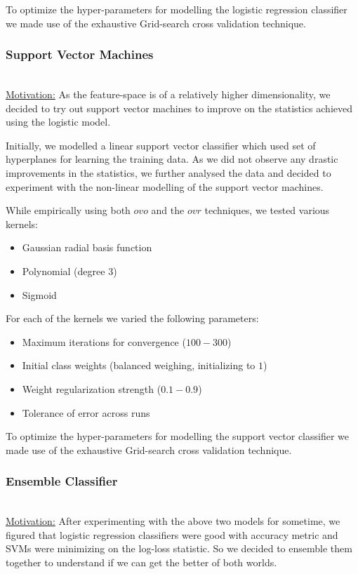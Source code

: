 \documentclass[fleqn,10pt]{SelfArx} %
\begin{document}
To optimize the hyper-parameters for modelling the logistic regression classifier we made use of the exhaustive Grid-search cross validation technique.

\subsubsection{Support Vector Machines}~\\
\underline{Motivation:} As the feature-space is of a relatively higher dimensionality, we decided to try out support vector machines to improve on the statistics achieved using the logistic model.

Initially, we modelled a linear support vector classifier which used set of hyperplanes for learning the training data. As we did not observe any drastic improvements in the statistics, we further analysed the data and decided to experiment with the non-linear modelling of the support vector machines.

While empirically using both $ovo$ and the $ovr$ techniques, we tested various kernels:
\begin{itemize}
  \item Gaussian radial basis function
  \item Polynomial (degree 3)
  \item Sigmoid
\end{itemize}

For each of the kernels we varied the following parameters:
\begin{itemize}
  \item Maximum iterations for convergence ($100-300$)
  \item Initial class weights (balanced weighing, initializing to $1$)
  \item Weight regularization strength ($0.1-0.9$)
  \item Tolerance of error across runs
\end{itemize}

To optimize the hyper-parameters for modelling the support vector classifier we made use of the exhaustive Grid-search cross validation technique.
\subsubsection{Ensemble Classifier}~\\
\underline{Motivation:} After experimenting with the above two models for sometime, we figured that logistic regression classifiers were good with accuracy metric and SVMs were minimizing on the log-loss statistic. So we decided to ensemble them together to understand if we can get the better of both worlds.
\end{document}
